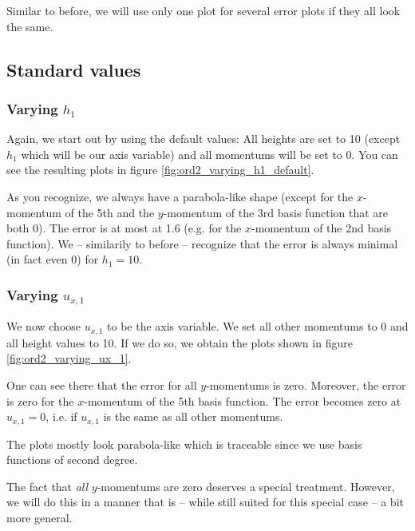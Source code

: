 \documentclass{article}
\begin{document}
Similar to before, we will use only one plot for several error plots if they all look the same.

\subsection{Standard values}
\label{sec:stiffness-analyiss-ord2-default}

\subsubsection{Varying $h_1$}
\label{sec:stiffness-analysis-ord2-default-var-h1}

Again, we start out by using the default values: All heights are set to 10 (except $h_1$ which will be our axis variable) and all momentums will be set to 0. You can see the resulting plots in figure \ref{fig:ord2_varying_h1_default}. 



As you recognize, we always have a parabola-like shape (except for the $x$-momentum of the 5th and the $y$-momentum of the 3rd basis function that are both 0). The error is at most at 1.6 (e.g. for the $x$-momentum of the 2nd basis function). We -- similarily to before -- recognize that the error is always minimal (in fact even 0) for $h_1=10$.

\subsubsection{Varying $u_{x,1}$}
\label{sec:stiffness-analysis-ord2-default-var-ux1}

We now choose $u_{x,1}$ to be the axis variable. We set all other momentums to 0 and all height values to 10. If we do so, we obtain the plots shown in figure \ref{fig:ord2_varying_ux_1}.



One can see there that the error for all $y$-momentums is zero. Moreover, the error is zero for the $x$-momentum of the 5th basis function. The error becomes zero at $u_{x,1}=0$, i.e. if $u_{x,1}$ is the same as all other momentums.

The plots mostly look parabola-like which is traceable since we use basis functions of second degree.

The fact that \emph{all} $y$-momentums are zero deserves a special treatment. However, we will do this in a manner that is -- while still suited for this special case -- a bit more general.
\end{document}
